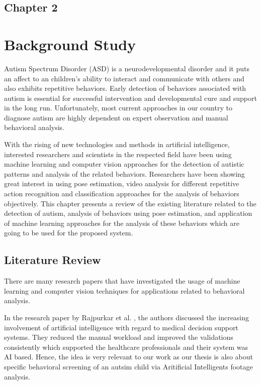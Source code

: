 \begin{center}
    \section*{\fontsize{20}{20}\selectfont Chapter 2}
\end{center}
\vspace{10mm}
\section{Background Study}

Autism Spectrum Disorder (ASD) is a neurodevelopmental disorder and it puts an affect to an children's ability to interact and communicate with others and also exhibits repetitive behaviors. Early detection of behaviors associated with autism is essential for successful intervention and developmental cure and support in the long run. Unfortunately, most current approaches in our country to diagnose autism are highly dependent on expert observation and manual behavioral analysis.

With the rising of new technologies and methods in artificial intelligence, interested researchers and scientists in the respected field have been using machine learning and computer vision approaches for the detection of autistic patterns and analysis of the related behaviors. Researchers have been showing great interest in using pose estimation, video analysis for different repetitive action recognition and classification approaches for the analysis of behaviors objectively. This chapter presents a review of the existing literature related to the detection of autism, analysis of behaviors using pose estimation, and application of machine learning approaches for the analysis of these behaviors which are going to be used for the proposed system.


\subsection{Literature Review}

There are many research papers that have investigated the usage of machine learning and computer vision techniques for applications related to behavioral analysis. 

In the research paper by Rajpurkar et al. \cite{rajpurkar2022ai}, the authors discussed the increasing involvement of artificial intelligence with regard to medical decision support systems. They reduced the manual workload and improved the validations consistently which supported the healthcare professionals and their system was AI based. Hence, the idea is very relevant to our work as our thesis is also about specific behavioral screening of an autsim child via Aritificial Intelligents footage analysis.

